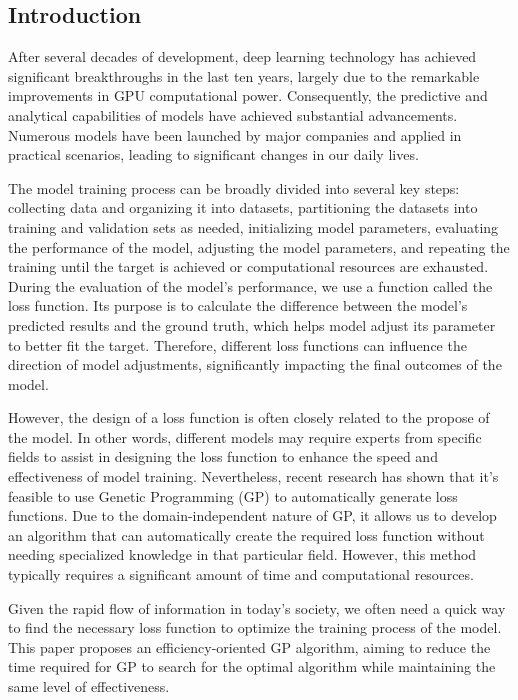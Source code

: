 \begin{ZhChapter}

\chapter{Introduction}

After several decades of development, deep learning \cite{deepLearning} technology has achieved significant breakthroughs in the last ten years, largely due to the remarkable improvements in GPU computational power. Consequently, the predictive and analytical capabilities of models have achieved substantial advancements. Numerous models have been launched by major companies and applied in practical scenarios, leading to significant changes in our daily lives.

The model training process can be broadly divided into several key steps: collecting data and organizing it into datasets, partitioning the datasets into training and validation sets as needed, initializing model parameters, evaluating the performance of the model, adjusting the model parameters, and repeating the training until the target is achieved or computational resources are exhausted. During the evaluation of the model's performance, we use a function called the loss function. Its purpose is to calculate the difference between the model's predicted results and the ground truth, which helps model adjust its parameter to better fit the target. Therefore, different loss functions can influence the direction of model adjustments, significantly impacting the final outcomes of the model.

However, the design of a loss function is often closely related to the propose of the model. In other words, different models may require experts from specific fields to assist in designing the loss function to enhance the speed and effectiveness of model training. Nevertheless, recent research has shown that it’s feasible to use Genetic Programming (GP) to automatically generate loss functions. Due to the domain-independent nature of GP, it allows us to develop an algorithm that can automatically create the required loss function without needing specialized knowledge in that particular field. However, this method typically requires a significant amount of time and computational resources.

Given the rapid flow of information in today's society, we often need a quick way to find the necessary loss function to optimize the training process of the model. This paper proposes an efficiency-oriented GP algorithm, aiming to reduce the time required for GP to search for the optimal algorithm while maintaining the same level of effectiveness.


\end{ZhChapter}
